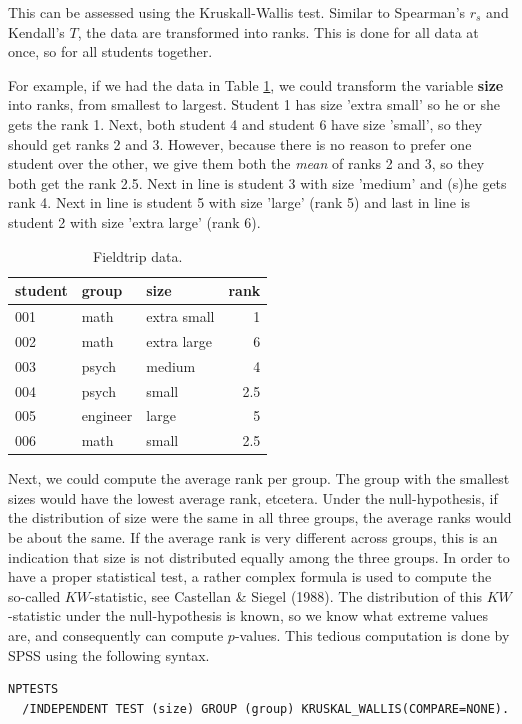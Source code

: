 \documentclass[]{report}\usepackage[]{graphicx}\usepackage[]{color}
\begin{document}
This can be assessed using the Kruskall-Wallis test. Similar to Spearman's $r_s$ and Kendall's $T$, the data are transformed into ranks. This is done for all data at once, so for all students together.

For example, if we had the data in Table \ref{tab:fieldtrip_1}, we could transform the variable \textbf{size} into ranks, from smallest to largest. Student 1 has size 'extra small' so he or she gets the rank 1. Next, both student 4 and student 6 have size 'small', so they should get ranks 2 and 3. However, because there is no reason to prefer one student over the other, we give them both the \textit{mean} of ranks 2 and 3, so they both get the rank 2.5. Next in line is student 3 with size 'medium' and (s)he gets rank 4. Next in line is student 5 with size 'large' (rank 5) and last in line is student 2 with size 'extra large' (rank 6).  


\begin{table}
\label{tab:fieldtrip_1}
\caption{Fieldtrip data.}
 \begin{tabular}{lllr}
 student & group & size & rank\\ \hline
 001 & math & extra small & 1\\
 002 & math & extra large & 6\\
 003 & psych & medium & 4\\
 004 & psych & small & 2.5\\
 005 & engineer & large & 5 \\
 006 & math & small & 2.5 \\
 \end{tabular}
\end{table}


Next, we could compute the average rank per group. The group with the smallest sizes would have the lowest average rank, etcetera. Under the null-hypothesis, if the distribution of size were the same in all three groups, the average ranks would be about the same. If the average rank is very different across groups, this is an indication that size is not distributed equally among the three groups. In order to have a proper statistical test, a rather complex formula is used to compute the so-called $KW$-statistic, see Castellan \& Siegel (1988). The distribution of this $KW$-statistic under the null-hypothesis is known, so we know what extreme values are, and consequently can compute $p$-values. This tedious computation is done by SPSS using the following syntax. 

\begin{verbatim}
NPTESTS 
  /INDEPENDENT TEST (size) GROUP (group) KRUSKAL_WALLIS(COMPARE=NONE).
\end{verbatim}
\end{document}
